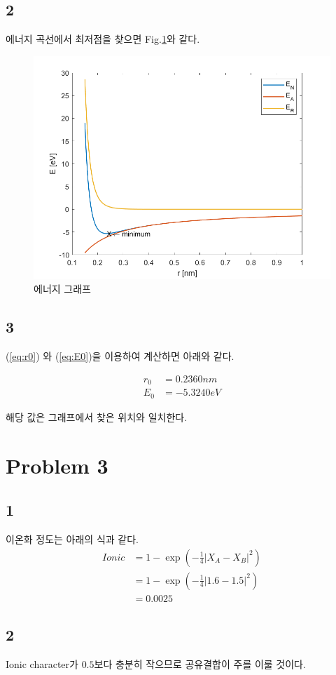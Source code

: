 \documentclass[a4paper]{oblivoir}
\begin{document}
\subsection{2}
에너지 곡선에서 최저점을 찾으면 Fig.\ref{fig:P2_2}와 같다.

\begin{figure}[htbp]
	\centerline{\includegraphics[width = 0.6\linewidth]{P2_2.png}}%
	\caption{\label{fig:P2_2}에너지 그래프}
\end{figure}


\subsection{3}
(\ref{eq:r0}) 와 (\ref{eq:E0})을 이용하여 계산하면 아래와 같다.

\begin{align}
	r_{0} &= 0.2360 nm\\
	E_{0} &= -5.3240 eV
\end{align}

해당 값은 그래프에서 찾은 위치와 일치한다.

\section{Problem 3}
\subsection{1}
이온화 정도는 아래의 식과 같다.
\begin{align}
	Ionic &= 1 - \exp\left( - \frac{1}{4}|X_{A}-X_{B}|^{2} \right)\\
	&=1 - \exp\left( - \frac{1}{4}|1.6-1.5|^{2} \right)\\
	&= 0.0025
\end{align}

\subsection{2}
Ionic character가 $0.5$보다 충분히 작으므로 공유결합이 주를 이룰 것이다.
\end{document}
